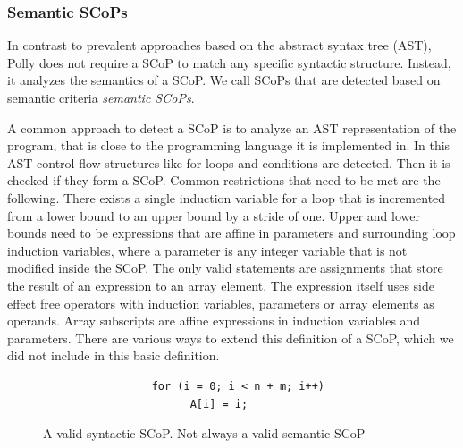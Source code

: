 \subsubsection{Semantic SCoPs}

In contrast to prevalent approaches based on the abstract syntax
tree (AST), Polly does not require a SCoP to match any specific syntactic
structure. Instead, it analyzes the semantics of a SCoP. We call SCoPs
that are detected based on semantic criteria \emph{semantic SCoPs}.

A common approach to detect a SCoP is to analyze an AST representation of
the program, that is close to the programming language it is implemented in. In
this AST control flow structures like for loops and conditions are
detected. Then it is checked if they form a SCoP. Common restrictions that need
to be met are the following. There exists a single induction variable for a
loop that is incremented from a lower bound to an upper bound by a stride of
one. Upper and lower bounds need to be expressions that are affine in parameters
and surrounding loop induction variables, where a parameter is any integer
variable that is not modified inside the SCoP.  The only valid statements are
assignments that store the result of an expression to an array element. The
expression itself uses side effect free operators with induction variables,
parameters or array elements as operands.  Array subscripts are affine
expressions in induction variables and parameters. There are various ways to
extend this definition of a SCoP, which we did not include in this basic
definition.

\begin{figure}

\begin{lstlisting}
                 for (i = 0; i < n + m; i++)
                       A[i] = i;
\end{lstlisting}
	\caption{A valid syntactic SCoP. Not always a valid semantic SCoP}
	\label{fig:syntacticScop}
\end{figure}

